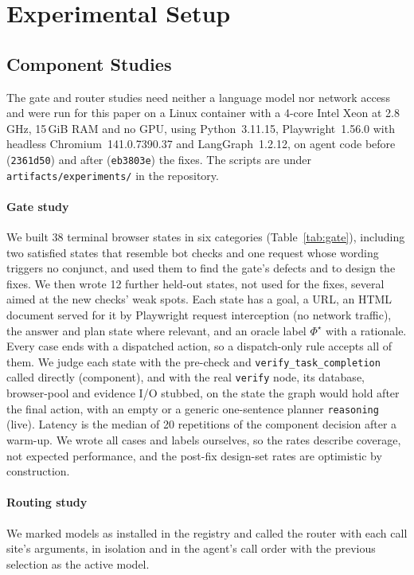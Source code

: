 \section{Experimental Setup}
\label{sec:setup}

\subsection{Component Studies}

The gate and router studies need neither a language model nor network access and were run for this paper on a Linux container with a 4-core Intel Xeon at 2.8\,GHz, 15\,GiB RAM and no GPU, using Python~3.11.15, Playwright~1.56.0 with headless Chromium~141.0.7390.37 and LangGraph~1.2.12, on agent code before (\texttt{2361d50}) and after (\texttt{eb3803e}) the fixes. The scripts are under \texttt{artifacts/experiments/} in the repository.

\paragraph{Gate study} We built 38 terminal browser states in six categories (Table~\ref{tab:gate}), including two satisfied states that resemble bot checks and one request whose wording triggers no conjunct, and used them to find the gate's defects and to design the fixes. We then wrote 12 further held-out states, not used for the fixes, several aimed at the new checks' weak spots. Each state has a goal, a URL, an HTML document served for it by Playwright request interception (no network traffic), the answer and plan state where relevant, and an oracle label $\Phi^{\star}$ with a rationale. Every case ends with a dispatched action, so a dispatch-only rule accepts all of them. We judge each state with the pre-check and \texttt{verify\_task\_completion} called directly (component), and with the real \texttt{verify} node, its database, browser-pool and evidence I/O stubbed, on the state the graph would hold after the final action, with an empty or a generic one-sentence planner \texttt{reasoning} (live). Latency is the median of 20 repetitions of the component decision after a warm-up. We wrote all cases and labels ourselves, so the rates describe coverage, not expected performance, and the post-fix design-set rates are optimistic by construction.

\paragraph{Routing study} We marked models as installed in the registry and called the router with each call site's arguments, in isolation and in the agent's call order with the previous selection as the active model.

